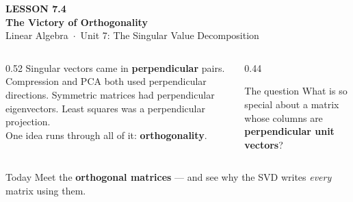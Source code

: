 \documentclass[aspectratio=169, 11pt]{beamer}
\begin{document}
{
\begin{frame}[plain]
  \vspace{2.8cm}\hspace{0.55cm}%
  \begin{minipage}{0.9\textwidth}
    {\color{goldacc}\bfseries\small LESSON 7.4}\\[0.5cm]
    {\color{white}\bfseries\LARGE The Victory of Orthogonality}\\[1.0cm]
    {\color{blushmid}\small Linear Algebra~$\cdot$~Unit 7: The Singular Value Decomposition}
  \end{minipage}
\end{frame}
}

\begin{frame}[t, plain]
  \begin{columns}[T]
    \begin{column}{0.52\textwidth}
      Singular vectors came in \textbf{perpendicular} pairs. Compression and PCA both used perpendicular
      directions. Symmetric matrices had perpendicular eigenvectors. Least squares was a perpendicular
      projection.\\[6pt]
      One idea runs through all of it: \textbf{orthogonality}.
    \end{column}
    \begin{column}{0.44\textwidth}
      \begin{block}{The question}
        What is so special about a matrix whose columns are \textbf{perpendicular unit vectors}?
      \end{block}
    \end{column}
  \end{columns}
  \vspace{2pt}
  \begin{block}{Today}
    Meet the \textbf{orthogonal matrices} --- and see why the SVD writes \emph{every} matrix using them.
  \end{block}
\end{frame}
\end{document}
